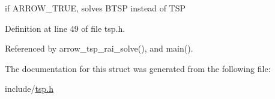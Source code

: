 if ARROW\_\-TRUE, solves BTSP instead of TSP 

Definition at line 49 of file tsp.h.

Referenced by arrow\_\-tsp\_\-rai\_\-solve(), and main().

The documentation for this struct was generated from the following file:\begin{CompactItemize}
\item 
include/\hyperlink{tsp_8h}{tsp.h}\end{CompactItemize}
